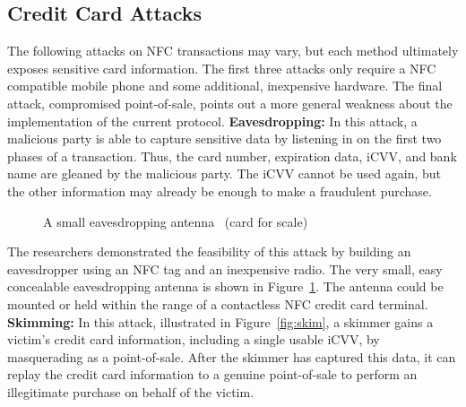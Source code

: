 \documentclass{sig-alternate}
\begin{document}
\subsection{Credit Card Attacks}
\label{sec:attacks}
The following attacks on NFC transactions may vary, but each method ultimately exposes sensitive card information. The first three attacks only require a NFC compatible mobile phone and some additional, inexpensive hardware. The final attack, compromised point-of-sale, points out a more general weakness about the implementation of the current protocol.
\vspace{2mm}\newline
\noindent\textbf{Eavesdropping:}
In this attack, a malicious party is able to capture sensitive data by listening in on the first two phases of a transaction. Thus, the card number, expiration data, iCVV, and bank name are gleaned by the malicious party. The iCVV cannot be used again, but the other information may already be enough to make a fraudulent purchase.

\begin{figure}
\centering
{}
\caption{A small eavesdropping antenna~\cite{CC2016} (card for scale)}
\label{fig:antenna}
\end{figure}

The researchers demonstrated the feasibility of this attack by building an eavesdropper using an NFC tag and an inexpensive radio. The very small, easy concealable eavesdropping antenna is shown in Figure~\ref{fig:antenna}. The antenna could be mounted or held within the range of a contactless NFC credit card terminal.
\vspace{2mm}\newline
\noindent\textbf{Skimming:}
In this attack, illustrated in Figure~\ref{fig:skim}, a skimmer gains a victim's credit card information, including a single usable iCVV, by masquerading as a point-of-sale. After the skimmer has captured this data, it can replay the credit card information to a genuine point-of-sale to perform an illegitimate purchase on behalf of the victim.
\end{document}
